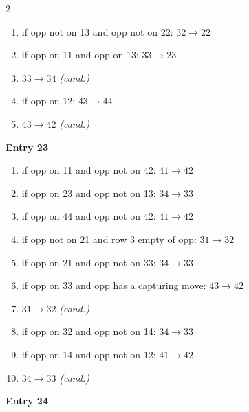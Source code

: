 \begin{multicols}{2}
\begin{enumerate}[topsep=1pt,itemsep=0pt,parsep=0pt,leftmargin=2.2em,label=\arabic*.]
\item if opp not on 13 and opp not on 22: $32\!\to\!22$
\item if opp on 11 and opp on 13: $33\!\to\!23$
\item $33\!\to\!34$ \hfill\textit{(cand.)}
\item if opp on 12: $43\!\to\!44$
\item $43\!\to\!42$ \hfill\textit{(cand.)}
\end{enumerate}\smallskip
\noindent\textbf{Entry 23} \; 
\nopagebreak\begin{enumerate}[topsep=1pt,itemsep=0pt,parsep=0pt,leftmargin=2.2em,label=\arabic*.]
\item if opp on 11 and opp not on 42: $41\!\to\!42$
\item if opp on 23 and opp not on 13: $34\!\to\!33$
\item if opp on 44 and opp not on 42: $41\!\to\!42$
\item if opp not on 21 and row 3 empty of opp: $31\!\to\!32$
\item if opp on 21 and opp not on 33: $34\!\to\!33$
\item if opp on 33 and opp has a capturing move: $43\!\to\!42$
\item $31\!\to\!32$ \hfill\textit{(cand.)}
\item if opp on 32 and opp not on 14: $34\!\to\!33$
\item if opp on 14 and opp not on 12: $41\!\to\!42$
\item $34\!\to\!33$ \hfill\textit{(cand.)}
\end{enumerate}\smallskip
\noindent\textbf{Entry 24} \; 
\end{multicols}

